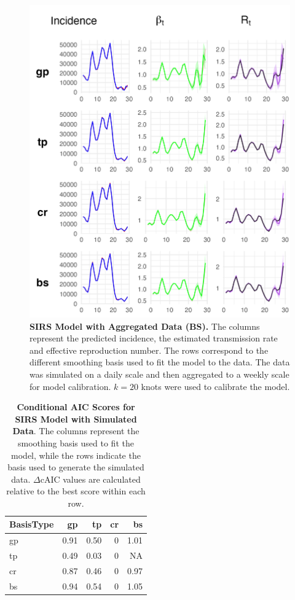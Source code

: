 \documentclass[
11pt, %
oneside, %
english, %
singlespacing, %
]{macthesis} %
\begin{document}
\begin{figure}[H]
\centering
\includegraphics[width=\textwidth]{figure/Simulated/aggregated/sim_agg_combined_bs.png}
\caption[SIRS model with aggregated data (BS).]{\textbf{SIRS Model with Aggregated Data (BS).} The columns represent the predicted incidence, the estimated transmission rate and effective reproduction number. The rows correspond to the different smoothing basis used to fit the model to the data. The data was simulated on a daily scale and then aggregated to a weekly scale for model calibration. \(k=20\) knots were used to calibrate the model.}
\label{fig:sim_agg_bs}
\end{figure}

\begin{table}[!h]
\centering
\caption{\label{tab:aic-table-sim}\textbf{Conditional AIC Scores for SIRS Model with Simulated Data}. The columns represent the smoothing basis used to fit the model, while the rows indicate the basis used to generate the simulated data. \(\Delta \text{cAIC}\) values are calculated relative to the best score within each row.}
\centering
\begin{tabular}[t]{lrrrr}
\toprule
BasisType & gp & tp & cr & bs\\
\midrule
gp & 0.91 & 0.50 & 0 & 1.01\\
tp & 0.49 & 0.03 & 0 & NA\\
cr & 0.87 & 0.46 & 0 & 0.97\\
bs & 0.94 & 0.54 & 0 & 1.05\\
\bottomrule
\end{tabular}
\end{table}
\end{document}
